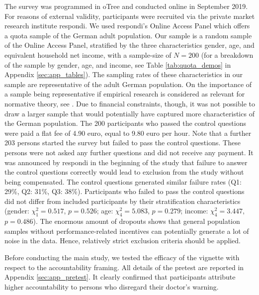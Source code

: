 \documentclass[smallcondensed]{svjour3}
\begin{document}
The survey was programmed in oTree \citep{chen_otree_2016} and conducted online in September 2019. For reasons of external validity, participants were recruited via the private market research institute respondi. We used respondi's Online Access Panel which offers a quota sample of the German adult population. Our sample is a random sample of the Online Access Panel, stratified by the three characteristics gender, age, and equivalent household net income, with a sample-size of $N=200$ (for a breakdown of the sample by gender, age, and income, see Table \ref{tab:quota_demos} in Appendix \ref{sec:app_tables}). The sampling rates of these characteristics in our sample are representative of the adult German population. On the importance of a sample being representative if empirical research is considered as relevant for normative theory, see \cite{schwettmann_simple_2020}. Due to financial constraints, though, it was not possible to draw a larger sample that would potentially have captured more characteristics of the German population. The 200 participants who passed the control questions were paid a flat fee of 4.90 euro, equal to 9.80 euro per hour. Note that a further 203 persons started the survey but failed to pass the control questions. These persons were not asked any further questions and did not receive any payment. It was announced by respondi in the beginning of the study that failure to answer the control questions correctly would lead to exclusion from the study without being compensated. The control questions generated similar failure rates (Q1: 29\%, Q2: 31\%, Q3: 38\%). Participants who failed to pass the control questions did not differ from included participants by their stratification characteristics (gender: $\chi_1^2=0.517$, $p=0.526$; age: $\chi_4^2=5.083$, $p=0.279$; income: $\chi_4^2=3.447$, $p=0.486$). The enormous amount of dropouts shows that general population samples without performance-related incentives can potentially generate a lot of noise in the data. Hence, relatively strict exclusion criteria should be applied.\par
%
Before conducting the main study, we tested the efficacy of the vignette with respect to the accountability framing. All details of the pretest are reported in Appendix \ref{sec:app_pretest}. It clearly confirmed that participants attribute higher accountability to persons who disregard their doctor's warning.\par
%
\end{document}
